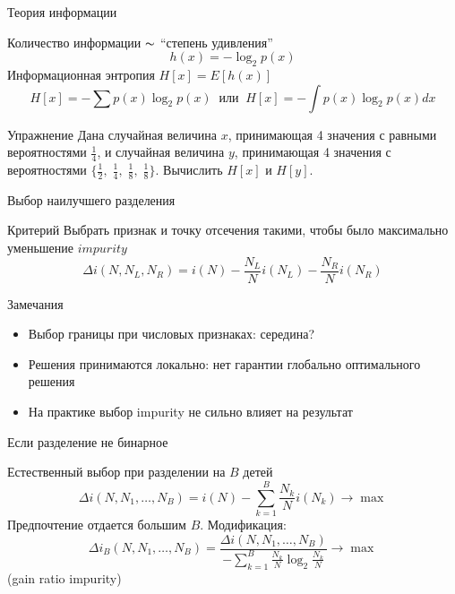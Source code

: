 \documentclass[aspectratio=169]{beamer}
\begin{document}
\begin{frame}{Теория информации}

Количество информации $\thicksim$ ``степень удивления''
\[
h(x) = -\log_2 p(x)
\]
Информационная энтропия $H[x] = E[h(x)]$
\[
H[x] = -\sum p(x) \log_2 p(x) \;\;\text{или}\;\; H[x] = - \int p(x) \log_2 p(x) dx
\]
\begin{exampleblock}{Упражнение}
Дана случайная величина $x$, принимающая 4 значения с равными вероятностями $\frac 1 4$, и случайная величина $y$, принимающая 4 значения с вероятностями $\{\frac 1 2, \; \frac 1 4, \; \frac 1 8, \; \frac 1 8\}$. Вычислить $H[x]$ и $H[y]$.
\end{exampleblock}

\end{frame}

\begin{frame}{Выбор наилучшего разделения}

\begin{block}{Критерий}
Выбрать признак и точку отсечения такими, чтобы было максимально уменьшение $impurity$
\[
\Delta i(N, N_L, N_R) = i(N) - \frac {N_L}{N} i(N_L) - \frac {N_R}{N} i(N_R)
\]
\end{block}

\vspace{1em}
Замечания
\begin{itemize}
\item Выбор границы при числовых признаках: середина?
\item Решения принимаются локально: нет гарантии глобально оптимального решения
\item На практике выбор impurity не сильно влияет на результат
\end{itemize}

\end{frame}

\begin{frame}{Если разделение не бинарное}

Естественный выбор при разделении на $B$ детей
\[
\Delta i(N, N_1, \ldots, N_B) = i(N) - \sum_{k=1}^B \frac{N_k}{N} i(N_k) \rightarrow \max
\]
Предпочтение отдается большим $B$. Модификация:
\[
\Delta i_B(N, N_1, \ldots, N_B) = \frac{\Delta i(N, N_1, \ldots, N_B)}{-\sum_{k=1}^B \frac{N_k}{N} \log_2 \frac{N_k}{N}} \rightarrow \max
\]
(gain ratio impurity)

\end{frame}
\end{document}
